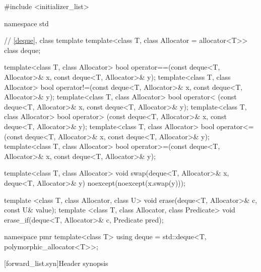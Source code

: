 \begin{codeblock}
#include <initializer_list>

namespace std {
  // \ref{deque}, class template 
  template<class T, class Allocator = allocator<T>> class deque;

  template<class T, class Allocator>
    bool operator==(const deque<T, Allocator>& x, const deque<T, Allocator>& y);
  template<class T, class Allocator>
    bool operator!=(const deque<T, Allocator>& x, const deque<T, Allocator>& y);
  template<class T, class Allocator>
    bool operator< (const deque<T, Allocator>& x, const deque<T, Allocator>& y);
  template<class T, class Allocator>
    bool operator> (const deque<T, Allocator>& x, const deque<T, Allocator>& y);
  template<class T, class Allocator>
    bool operator<=(const deque<T, Allocator>& x, const deque<T, Allocator>& y);
  template<class T, class Allocator>
    bool operator>=(const deque<T, Allocator>& x, const deque<T, Allocator>& y);

  template<class T, class Allocator>
    void swap(deque<T, Allocator>& x, deque<T, Allocator>& y)
      noexcept(noexcept(x.swap(y)));

  template <class T, class Allocator, class U>
    void erase(deque<T, Allocator>& c, const U& value);
  template <class T, class Allocator, class Predicate>
    void erase_if(deque<T, Allocator>& c, Predicate pred);

  namespace pmr {
    template<class T>
      using deque = std::deque<T, polymorphic_allocator<T>>;
  }
}
\end{codeblock}

[forward_list.syn]{Header  synopsis}

%

